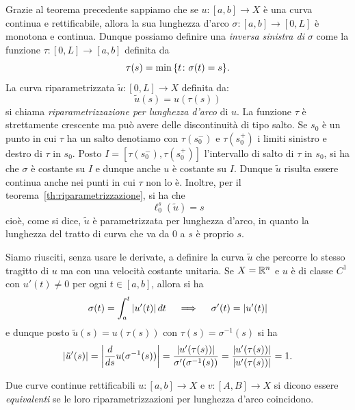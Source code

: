 Grazie al teorema precedente sappiamo che se $u\colon [a,b] \to X$ è una curva continua e rettificabile, 
allora la sua lunghezza d'arco $\sigma\colon[a,b] \to [0,L]$ è monotona e continua.
Dunque possiamo definire una \emph{inversa sinistra di $\sigma$} 
come la funzione $\tau\colon [0,L] \to [a,b]$ definita da
\[
  \tau(s) = \min {\left\{ t\colon \sigma(t)=s \right\}}.
\]
La curva riparametrizzata $\tilde u\colon [0,L] \to X$ definita da:
\[
  \tilde u(s) = u(\tau(s))
\]
si chiama \emph{riparametrizzazione per lunghezza d'arco} di $u$.
La funzione $\tau$ è strettamente crescente ma può avere delle discontinuità 
di tipo salto. Se $s_0$ è un punto in cui $\tau$ ha un salto denotiamo con 
$\tau(s_0^-)$ e $\tau(s_0^+)$ i limiti sinistro e destro di $\tau$ in $s_0$.
Posto $I = [\tau(s_0^-), \tau(s_0^+)]$ 
l'intervallo di salto di $\tau$ in $s_0$, 
si ha che $\sigma$ è costante su $I$ e dunque anche $u$ è costante su $I$.
Dunque $\tilde u$ risulta essere continua anche nei punti in cui $\tau$ non lo è.
Inoltre, per il teorema~\ref{th:riparametrizzazione}, si ha che 
\[
  \ell_0^s(\tilde u) = s
\]
cioè, come si dice, $\tilde u$ è parametrizzata per lunghezza d'arco, in quanto 
la lunghezza del tratto di curva che va da $0$ a $s$ è proprio $s$.

Siamo riusciti, senza usare le derivate, a definire la curva $\tilde u$ che percorre 
lo stesso tragitto di $u$ ma con una velocità costante unitaria. 
Se $X={\mathbb R}^n$ e $u$ è di classe $C^1$ con $u'(t)\neq 0$ per ogni $t\in[a,b]$,
allora si ha 
\[
  \sigma(t) = \int_a^t {\left|u'(t)\right|}\, dt 
  \quad\implies\quad
  \sigma'(t) = {\left|u'(t)\right|} 
\]
e dunque posto $\tilde u(s) = u(\tau(s))$ con $\tau(s) = \sigma^{-1}(s)$ si ha
\[
 {\left|\tilde u'(s)\right|}
 = {\left|\frac{d}{ds} u(\sigma^{-1}(s))\right|}
 = \frac{{\left|u'(\tau(s))\right|}}{\sigma'(\sigma^{-1}(s))}
 = \frac{{\left|u'(\tau(s))\right|}}{{\left|u'(\tau(s))\right|}} = 1.
\]


\begin{definition}
Due curve continue rettificabili $u \colon [a,b] \to X$ e $v \colon [A,B] \to X$ 
si dicono essere \emph{equivalenti} se le loro riparametrizzazioni per 
lunghezza d'arco coincidono.
\end{definition}

